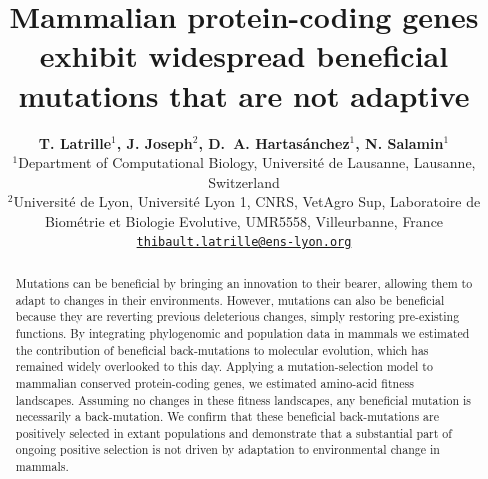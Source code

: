 \documentclass{article}
\title{Mammalian protein-coding genes exhibit widespread beneficial mutations that are not adaptive}
\author{
    \large
    \textbf{T. {Latrille}$^{1}$, J. {Joseph}$^{2}$, D.~A. {Hartasánchez}$^{1}$, N. {Salamin}$^{1}$}\\
    \normalsize
    $^{1}$Department of Computational Biology, Université de Lausanne, Lausanne, Switzerland\\
    $^{2}$Université de Lyon, Université Lyon 1, CNRS, VetAgro Sup, Laboratoire de Biométrie et Biologie Evolutive, UMR5558, Villeurbanne, France \\
    \texttt{\href{mailto:thibault.latrille@ens-lyon.org}{thibault.latrille@ens-lyon.org}} \\
}
\begin{document}
    \maketitle

    \begin{abstract}
        Mutations can be beneficial by bringing an innovation to their bearer, allowing them to adapt to changes in their environments. However, mutations can also be beneficial because they are reverting previous deleterious changes, simply restoring pre-existing functions. By integrating phylogenomic and population data in mammals we estimated the contribution of beneficial back-mutations to molecular evolution, which has remained widely overlooked to this day. Applying a mutation-selection model to mammalian conserved protein-coding genes, we estimated amino-acid fitness landscapes. Assuming no changes in these fitness landscapes, any beneficial mutation is necessarily a back-mutation. We confirm that these beneficial back-mutations are positively selected in extant populations and demonstrate that a substantial part of ongoing positive selection is not driven by adaptation to environmental change in mammals.
    \end{abstract}

\end{document}
